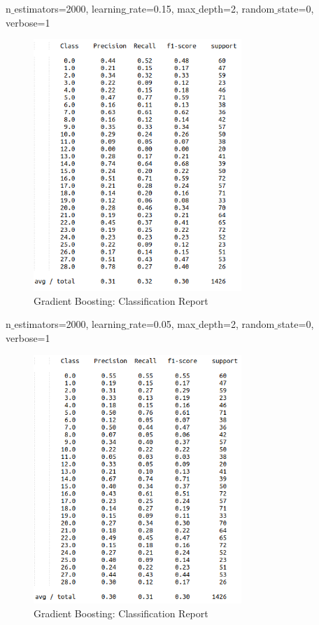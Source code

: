 \documentclass[12pt]{report}
\begin{document}
\newpage
n$\_$estimators=2000, learning$\_$rate=0.15, max$\_$depth=2, random$\_$state=0, verbose=1
\begin{figure}[H]
  \centering
  \includegraphics[width=0.7\textwidth]{Images/gb2.png}
  \caption{Gradient Boosting: Classification Report}
\end{figure}

\newpage
n$\_$estimators=2000, learning$\_$rate=0.05, max$\_$depth=2, random$\_$state=0, verbose=1
\begin{figure}[H]
  \centering
  \includegraphics[width=0.7\textwidth]{Images/gb3.png}
  \caption{Gradient Boosting: Classification Report}
\end{figure}
\end{document}
